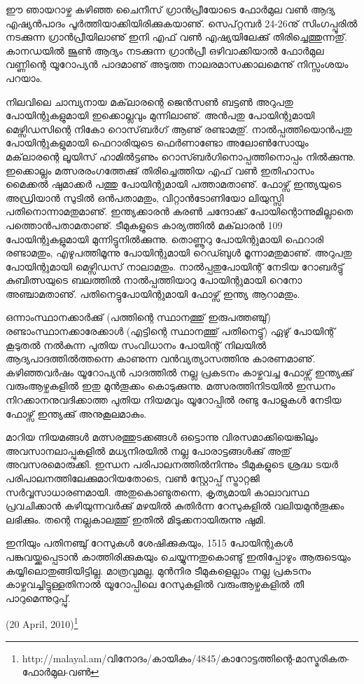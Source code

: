 ﻿
\vskip 2pt
ഈ ഞായറാഴ്ച കഴിഞ്ഞ ചൈനീസ് ഗ്രാന്‍പ്രീയോടെ ഫോര്‍മുല വണ്‍ ആദ്യ എഷ്യന്‍പാദം പൂര്‍ത്തിയാക്കിയിരിക്കുകയാണു്. 
സെപ്റ്റമ്പര്‍ 24-26നു് സിംഗപ്പൂരില്‍ നടക്കുന്ന ഗ്രാന്‍പ്രീയിലാണു് ഇനി എഫ് വണ്‍ എഷ്യയിലേക്കു് തിരിച്ചെത്തുന്നതു്.
കാനഡയില്‍ ജൂണ്‍ ആദ്യം നടക്കുന്ന ഗ്രാന്‍പ്രീ ഒഴിവാക്കിയാല്‍ ഫോര്‍മുല വണ്ണിന്റെ യൂറോപ്യന്‍ പാദമാണു് അടുത്ത 
നാലരമാസക്കാലമെന്നു് നിസ്സംശയം പറയാം.

നിലവിലെ ചാമ്പ്യനായ മക്‌ലാരന്റെ ജെന്‍സണ്‍ ബട്ടണ്‍ അറുപതു പോയിന്റുകളുമായി ഇക്കൊല്ലവും മുന്നിലാണു്. 
അന്‍പതു പോയിന്റുമായി മെഴ്സിഡസിന്റെ നികോ റൊസ്‌ബര്‍ഗ് ആണു് രണ്ടാമതു്. നാല്‍പ്പത്തിയൊന്‍പതു പോയിന്റുകളുമായി 
ഫെറാരിയുടെ ഫെര്‍ണാണ്ടോ അലോണ്‍സോയും മക്‌ലാരന്റെ ലൂയിസ് ഹാമില്‍ട്ടണും റൊസ്ബര്‍ഗിനൊപ്പത്തിനൊപ്പം 
നില്‍ക്കുന്നു. ഇക്കൊല്ലം മത്സരരംഗത്തേക്കു് തിരിച്ചെത്തിയ എഫ് വണ്‍ ഇതിഹാസം മൈക്കല്‍ ഷുമാക്കര്‍ പത്തു 
പോയിന്റുമായി പത്താമതാണു്. ഫോഴ്സ് ഇന്ത്യയുടെ അഡ്രിയാന്‍ സുടില്‍ ഒന്‍പതാമതും, വിറ്റാന്‍ടോണിയോ ലിയുസ്സി 
പതിനൊന്നാമതുമാണു്. ഇന്ത്യക്കാരന്‍ കരണ്‍ ചന്ദോക്ക് പോയിന്റൊന്നുമില്ലാതെ പത്തൊന്‍പതാമതാണു്. ടീമുകളുടെ 
കാര്യത്തില്‍ മക്‌ലാരന്‍ 109 പോയിന്റുകളുമായി മുന്നിട്ടുനില്‍ക്കുന്നു. തൊണ്ണൂറു പോയിന്റുമായി ഫെറാരി രണ്ടാമതും, 
എഴുപത്തിമൂന്നു പോയിന്റുമായി റെഡ്ബുള്‍ മൂന്നാമതുമാണു്. അറുപതു പോയിന്റുമായി മെഴ്സിഡസ് നാലാമതും. 
നാല്‍പ്പതുപോയിന്റ് നേടിയ റോബര്‍ട്ടു് കുബിത്സയുടെ ബലത്തില്‍ നാല്‍പ്പത്തിയാറു പോയിന്റുമായി റെനോ 
അഞ്ചാമതാണു്. പതിനെട്ടുപോയിന്റുമായി ഫോഴ്സ് ഇന്ത്യ ആറാമതും.

ഒന്നാംസ്ഥാനക്കാര്‍ക്കു് (പത്തിന്റെ സ്ഥാനത്തു് ഇരുപത്തഞ്ചു്) രണ്ടാംസ്ഥാനക്കാരേക്കാള്‍ (എട്ടിന്റെ 
സ്ഥാനത്തു് പതിനെട്ടു്) ഏഴു് പോയിന്റ് കൂടുതല്‍ നല്‍കുന്ന പുതിയ സംവിധാനം പോയിന്റ് നിലയില്‍ ആദ്യപാദത്തില്‍ത്തന്നെ 
കാണുന്ന വന്‍വ്യത്യാസത്തിനു കാരണമാണു്. കഴിഞ്ഞവര്‍ഷം യൂറോപ്യന്‍ പാദത്തില്‍ നല്ല പ്രകടനം കാഴ്ചവച്ച 
ഫോഴ്സ് ഇന്ത്യക്കു് വരുംആഴ്ചകളില്‍ ഇതു മുന്‍തൂക്കം കൊടുക്കുന്നു. മത്സരത്തിനിടയില്‍ ഇന്ധനം നിറക്കാനനുവദിക്കാത്ത 
പുതിയ നിയമവും യൂറോപ്പില്‍ രണ്ടു പോളുകള്‍ നേടിയ ഫോഴ്സ് ഇന്ത്യക്കു് അനുകൂലമാകും.

മാറിയ നിയമങ്ങള്‍ മത്സരത്തുടക്കങ്ങള്‍ ഒട്ടൊന്നു വിരസമാക്കിയെങ്കിലും അവസാനലാപ്പുകളില്‍ മധ്യനിരയില്‍ നല്ല 
പോരാട്ടങ്ങള്‍ക്കു് അതു് അവസരമൊരുക്കി. ഇന്ധന പരിപാലനത്തില്‍നിന്നും ടീമുകളുടെ ശ്രദ്ധ ടയര്‍ 
പരിപാലനത്തിലേക്കുമാറിയതോടെ, വണ്‍ സ്റ്റോപ്പ് സ്ട്രാറ്റജി സര്‍‌വ്വസാധാരണമായി. അതുകൊണ്ടുതന്നെ, കൃത്യമായി 
കാലാവസ്ഥ പ്രവചിക്കാന്‍ കഴിയുന്നവര്‍ക്കു് മഴയില്‍ കുതിര്‍ന്ന റേസുകളില്‍ വലിയമുന്‍തൂക്കം ലഭിക്കും. തന്റെ നല്ലകാലത്തു് 
ഇതില്‍ മിടുക്കനായിരുന്നു ഷുമി.

ഇനിയും പതിനഞ്ചു് റേസുകള്‍ ശേഷിക്കുകയും, 1515 പോയിന്റുകള്‍ പങ്കുവയ്ക്കപ്പെടാന്‍ കാത്തിരിക്കുകയും ചെയ്യുന്നതുകൊണ്ടു് 
ഇതിപ്പോഴും ആരുടെയും കയ്യിലൊതുങ്ങിയിട്ടില്ല. മാത്രവുമല്ല, മുന്‍നിര ടീമുകളെല്ലാം നല്ല പ്രകടനം കാഴ്ചവച്ചിട്ടുള്ളതിനാല്‍ 
യൂറോപ്പിലെ റേസുകളില്‍ വരുംആഴ്ചകളില്‍ തീ പാറുമെന്നുറുപ്പു്. 

\begin{flushright}(20 April, 2010)\footnote{http://malayal.am/വിനോദം/കായികം/4845/കാറോട്ടത്തിന്റെ-മാസ്മരികത-ഫോര്‍മുല-വണ്‍}\end{flushright}

\newpage
